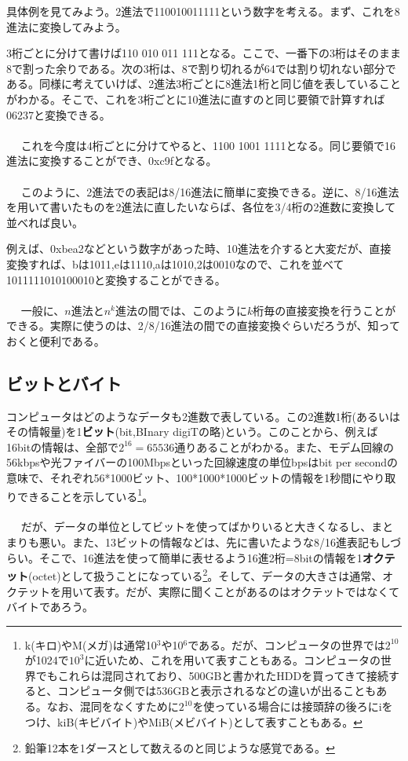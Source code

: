 具体例を見てみよう。2進法で110010011111という数字を考える。まず、これを8進法に変換してみよう。

3桁ごとに分けて書けば110 010 011 111となる。ここで、一番下の3桁はそのまま8で割った余りである。次の3桁は、8で割り切れるが64では割り切れない部分である。同様に考えていけば、2進法3桁ごとに8進法1桁と同じ値を表していることがわかる。そこで、これを3桁ごとに10進法に直すのと同じ要領で計算すれば06237と変換できる。
\\ \\　
これを今度は4桁ごとに分けてやると、1100 1001 1111となる。同じ要領で16進法に変換することができ、0xc9fとなる。
\\ \\　
このように、2進法での表記は8/16進法に簡単に変換できる。逆に、8/16進法を用いて書いたものを2進法に直したいならば、各位を3/4桁の2進数に変換して並べれば良い。

例えば、0xbea2などという数字があった時、10進法を介すると大変だが、直接変換すれば、bは1011,eは1110,aは1010,2は0010なので、これを並べて1011111010100010と変換することができる。
\\ \\　
一般に、$n$進法と$n^k$進法の間では、このように$k$桁毎の直接変換を行うことができる。実際に使うのは、2/8/16進法の間での直接変換ぐらいだろうが、知っておくと便利である。

\subsection{ビットとバイト}
コンピュータはどのようなデータも2進数で表している。この2進数1桁(あるいはその情報量)を1\textbf{ビット}(bit,BInary digiTの略)という。このことから、例えば16bitの情報は、全部で$2^{16}=65536$通りあることがわかる。また、モデム回線の56kbpsや光ファイバーの100Mbpsといった回線速度の単位bpsはbit per secondの意味で、それぞれ56*1000ビット、100*1000*1000ビットの情報を1秒間にやり取りできることを示している\footnote{k(キロ)やM(メガ)は通常10$^3$や10$^6$である。だが、コンピュータの世界では$2^{10}$が1024で$10^3$に近いため、これを用いて表すこともある。コンピュータの世界でもこれらは混同されており、500GBと書かれたHDDを買ってきて接続すると、コンピュータ側では536GBと表示されるなどの違いが出ることもある。なお、混同をなくすために$2^{10}$を使っている場合には接頭辞の後ろにiをつけ、kiB(キビバイト)やMiB(メビバイト)として表すこともある。}。
\\ \\　
だが、データの単位としてビットを使ってばかりいると大きくなるし、まとまりも悪い。また、13ビットの情報などは、先に書いたような8/16進表記もしづらい。そこで、16進法を使って簡単に表せるよう16進2桁=8bitの情報を1\textbf{オクテット}(octet)として扱うことになっている\footnote{鉛筆12本を1ダースとして数えるのと同じような感覚である。}。そして、データの大きさは通常、オクテットを用いて表す。だが、実際に聞くことがあるのはオクテットではなくてバイトであろう。

